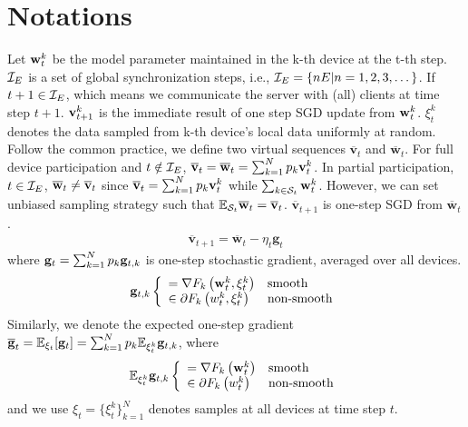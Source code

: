 
\section{Notations}


Let ${\mathbf{w}}_t^k$ be the model parameter maintained in the k-th device at the t-th step. ${\mathcal{I}}_E$ is a set of global synchronization steps, i.e., ${\mathcal{I}}_E = \{n E|n = 1, 2, 3,\dots \}$. If $t+1 \in {\mathcal{I}}_E$, which means we communicate the server with (all) clients at time step $t+1$. ${\mathbf{v}}^k_{t+1}$ is the immediate result of one step SGD update from ${\mathbf{w}}^k_{t}$.
$\xi_{t}^{k}$ denotes the data sampled from k-th device’s local data uniformly at random.
Follow the common practice, we define two virtual sequences $\overline{\mathbf{v}}_{t}$ and $\overline{\mathbf{w}}_{t}$. For full device participation and $t \notin {\mathcal{I}}_E$,
${\overline{\mathbf{v}}}_t = {\overline{\mathbf{w}}}_t =\sum_{k=1}^{N} p_{k} \mathbf{v}_{t}^{k}$. In partial participation, $t \in {\mathcal{I}}_E$, ${\overline{\mathbf{w}}}_t \neq {\overline{\mathbf{v}}}_t$ since ${\overline{\mathbf{v}}}_t=\sum_{k=1}^{N} p_{k} \mathbf{v}_{t}^{k}$ while $\sum_{k\in {\mathcal{S}}_t}\mathbf{w}_{t}^{k}$. However, we can
set unbiased sampling strategy such that $ \mathbb{E}_{{\mathcal{S}}_t} {\overline{\mathbf{w}}}_t = {\overline{\mathbf{v}}}_t$.
$\overline{\mathbf{v}}_{t+1}$ is one-step SGD from $\overline{\mathbf{w}}_{t}$. 
\begin{align}
\overline{\mathbf{v}}_{t+1}=\overline{\mathbf{w}}_{t}-\eta_{t} \mathbf{g}_{t}	\label{eq:vbar}
\end{align}
where ${\mathbf{g}}_{t} = \sum_{k=1}^{N} p_{k} {\mathbf{g}}_{t,k} $ is one-step stochastic gradient, averaged over all devices. 
\begin{align}
{\mathbf{g}}_{t,k} \left\{\begin{array}{ll} 
 = \nabla F_{k}\left(\mathbf{w}_{t}^{k},\xi_{t}^{k} \right)  &  \text{smooth}\\
 \in \partial F_{k}\left(w_{t}^{k}, \xi_{t}^{k}\right)  & \text{non-smooth}
 \end{array}\right.
\end{align}
Similarly, we denote the expected one-step gradient ${\overline{\mathbf{g}}}_{t}= \mathbb{E}_{\xi_t}[{\mathbf{g}}_t] = \sum_{k=1}^{N} p_{k} \mathbb{E}_{\xi_{t}^{k}} {\mathbf{g}}_{t,k}$, where
\begin{align}
\mathbb{E}_{\xi_{t}^{k}} {\mathbf{g}}_{t,k}  \left\{\begin{array}{ll} 
 = \nabla F_{k}\left(\mathbf{w}_{t}^{k}\right)  &  \text{smooth}\\
 \in \partial F_{k}\left(w_{t}^{k}\right)  & \text{non-smooth}
 \end{array}\right.
\end{align}
and we use $\xi_t = \{\xi_t^k\}_{k=1}^N$ denotes samples at all devices at time step $t$. 

